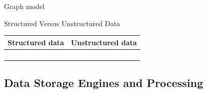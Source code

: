 \begin{frame}{Graph model}
  \begin{sidebody}
  \end{sidebody}
\end{frame}

\begin{frame}{Structured Versus Unstructured Data}
  \footnotesize
  \renewcommand{\arraystretch}{1.25}
  \begin{tabular}{@{}%
    >{\raggedright\arraybackslash}p{}%
    >{\raggedright\arraybackslash}p{}@{}}
    \toprule
    \textbf{Structured data} & \textbf{Unstructured data}\\
    \midrule
     & \\
     & \\
     & \\
     & \\
    \bottomrule
  \end{tabular}
\end{frame}
\fi

\subsection{Data Storage Engines and Processing}

\begin{frame}[plain]
\end{frame}

\begin{frame}[plain]
\end{frame}

\begin{frame}[plain]
\end{frame}

\begin{frame}[plain]
\end{frame}

